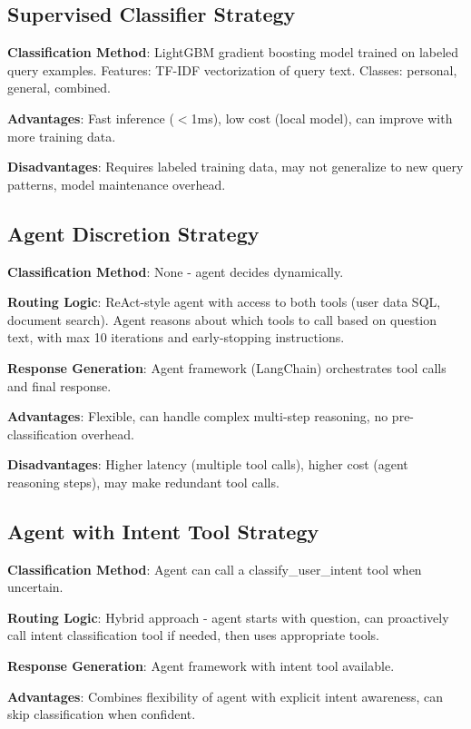 \documentclass[twocolumn,10pt]{article}
\begin{document}
\subsection{Supervised Classifier Strategy}

\textbf{Classification Method}: LightGBM gradient boosting model trained on labeled query examples. Features: TF-IDF vectorization of query text. Classes: personal, general, combined.

\textbf{Advantages}: Fast inference ($<$1ms), low cost (local model), can improve with more training data.

\textbf{Disadvantages}: Requires labeled training data, may not generalize to new query patterns, model maintenance overhead.

\subsection{Agent Discretion Strategy}

\textbf{Classification Method}: None - agent decides dynamically.

\textbf{Routing Logic}: ReAct-style agent with access to both tools (user data SQL, document search). Agent reasons about which tools to call based on question text, with max 10 iterations and early-stopping instructions.

\textbf{Response Generation}: Agent framework (LangChain) orchestrates tool calls and final response.

\textbf{Advantages}: Flexible, can handle complex multi-step reasoning, no pre-classification overhead.

\textbf{Disadvantages}: Higher latency (multiple tool calls), higher cost (agent reasoning steps), may make redundant tool calls.

\subsection{Agent with Intent Tool Strategy}

\textbf{Classification Method}: Agent can call a classify\_user\_intent tool when uncertain.

\textbf{Routing Logic}: Hybrid approach - agent starts with question, can proactively call intent classification tool if needed, then uses appropriate tools.

\textbf{Response Generation}: Agent framework with intent tool available.

\textbf{Advantages}: Combines flexibility of agent with explicit intent awareness, can skip classification when confident.
\end{document}
